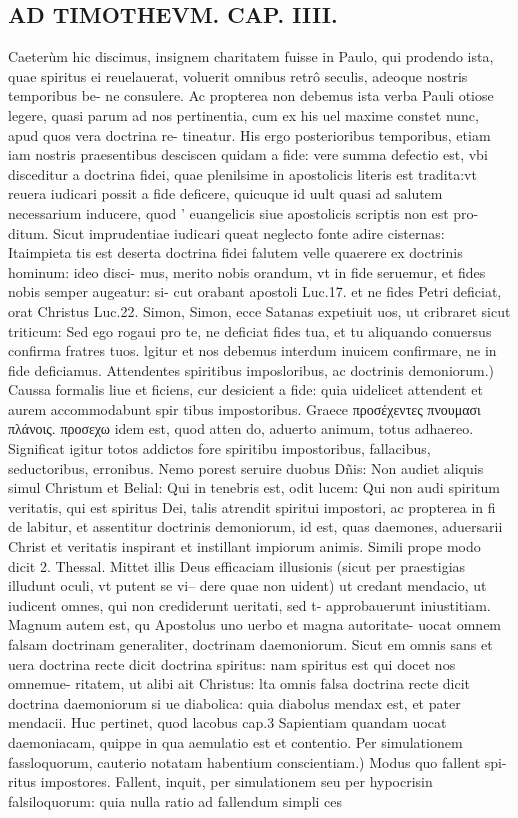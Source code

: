 \documentclass{article}
\begin{document}
\begin{pages}
\section*{AD TIMOTHEVM. CAP. IIII. }
\marginpar{[ p.91 ]}\pstart Caeterùm hic discimus, insignem charitatem fuisse in Paulo, qui prodendo ista, quae spiritus ei reuelauerat, voluerit omnibus retrô seculis, adeoque nostris temporibus be- ne consulere. Ac propterea non debemus ista verba Pauli otiose legere, quasi parum ad nos pertinentia, cum ex his uel maxime constet nunc, apud quos vera doctrina re- tineatur. His ergo posterioribus temporibus, etiam iam nostris praesentibus desciscen quidam a fide: vere summa defectio est, vbi disceditur a doctrina fidei, quae plenilsime in apostolicis literis est tradita:vt reuera iudicari possit a fide deficere, quicuque id uult quasi ad salutem necessarium inducere, quod ' euangelicis siue apostolicis scriptis non est pro- ditum. Sicut imprudentiae iudicari queat neglecto fonte adire cisternas: Itaimpieta tis est deserta doctrina fidei falutem velle quaerere ex doctrinis hominum: ideo disci- mus, merito nobis orandum, vt in fide seruemur, et fides nobis semper augeatur: si- cut orabant apostoli Luc.17. et ne fides Petri deficiat, orat Christus Luc.22. Simon, Simon, ecce Satanas expetiuit uos, ut cribraret sicut triticum: Sed ego rogaui pro te, ne deficiat fides tua, et tu aliquando conuersus confirma fratres tuos. lgitur et nos debemus interdum inuicem confirmare, ne in fide deficiamus.  \pend\pstart Attendentes spiritibus imposloribus, ac doctrinis demoniorum.) Caussa formalis liue et ficiens, cur desicient a fide: quia uidelicet attendent et aurem accommodabunt spir tibus impostoribus. Graece προσέχεντες πνουμασι πλάνοις. προσεχω idem est, quod atten do, aduerto animum, totus adhaereo. Significat igitur totos addictos fore spiritibu impostoribus, fallacibus, seductoribus, erronibus. Nemo porest seruire duobus Dñis: Non audiet aliquis simul Christum et Belial: Qui in tenebris est, odit lucem: Qui non audi spiritum veritatis, qui est spiritus Dei, talis atrendit spiritui impostori, ac propterea in fi de labitur, et assentitur doctrinis demoniorum, id est, quas daemones, aduersarii Christ et veritatis inspirant et instillant impiorum animis. Simili prope modo dicit 2. Thessal. Mittet illis Deus efficaciam illusionis (sicut per praestigias illudunt oculi, vt putent se vi-- dere quae non uident) ut credant mendacio, ut iudicent omnes, qui non crediderunt ueritati, sed t- approbauerunt iniustitiam. Magnum autem est, qu Apostolus uno uerbo et magna autoritate- uocat omnem falsam doctrinam generaliter, doctrinam daemoniorum. Sicut em omnis sans et uera doctrina recte dicit doctrina spiritus: nam spiritus est qui docet nos omnemue- ritatem, ut alibi ait Christus: lta omnis falsa doctrina recte dicit doctrina daemoniorum si ue diabolica: quia diabolus mendax est, et pater mendacii. Huc pertinet, quod lacobus cap.3 Sapientiam quandam uocat daemoniacam, quippe in qua aemulatio est et contentio.  \pend\pstart Per simulationem fassloquorum, cauterio notatam habentium conscientiam.) Modus quo fallent spi- ritus impostores. Fallent, inquit, per simulationem seu per hypocrisin falsiloquorum: quia nulla ratio ad fallendum simpli ces 
\end{pages}
\end{document}
